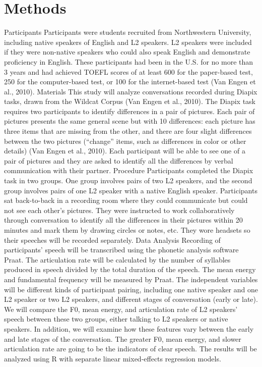 \documentclass[
  man,
  floatsintext,
  longtable,
  nolmodern,
  notxfonts,
  notimes,
  colorlinks=true,linkcolor=blue,citecolor=blue,urlcolor=blue]{apa7}
\begin{document}
\section{Methods}\label{methods}

Participants Participants were students recruited from Northwestern
University, including native speakers of English and L2 speakers. L2
speakers were included if they were non-native speakers who could also
speak English and demonstrate proficiency in English. These participants
had been in the U.S. for no more than 3 years and had achieved TOEFL
scores of at least 600 for the paper-based test, 250 for the
computer-based test, or 100 for the internet-based test (Van Engen et
al., 2010). Materials This study will analyze conversations recorded
during Diapix tasks, drawn from the Wildcat Corpus (Van Engen et al.,
2010). The Diapix task requires two participants to identify differences
in a pair of pictures. Each pair of pictures presents the same general
scene but with 10 differences: each picture has three items that are
missing from the other, and there are four slight differences between
the two pictures (``change'' items, such as differences in color or
other details) (Van Engen et al., 2010). Each participant will be able
to see one of a pair of pictures and they are asked to identify all the
differences by verbal communication with their partner. Procedure
Participants completed the Diapix task in two groups. One group involves
pairs of two L2 speakers, and the second group involves pairs of one L2
speaker with a native English speaker. Participants sat back-to-back in
a recording room where they could communicate but could not see each
other's pictures. They were instructed to work collaboratively through
conversation to identify all the differences in their pictures within 20
minutes and mark them by drawing circles or notes, etc. They wore
headsets so their speeches will be recorded separately. Data Analysis
Recording of participants' speech will be transcribed using the phonetic
analysis software Praat. The articulation rate will be calculated by the
number of syllables produced in speech divided by the total duration of
the speech. The mean energy and fundamental frequency will be measured
by Praat. The independent variables will be different kinds of
participant pairing, including one native speaker and one L2 speaker or
two L2 speakers, and different stages of conversation (early or late).
We will compare the F0, mean energy, and articulation rate of L2
speakers' speech between these two groups, either talking to L2 speakers
or native speakers. In addition, we will examine how these features vary
between the early and late stages of the conversation. The greater F0,
mean energy, and slower articulation rate are going to be the indicators
of clear speech. The results will be analyzed using R with separate
linear mixed-effects regression models.
\end{document}
